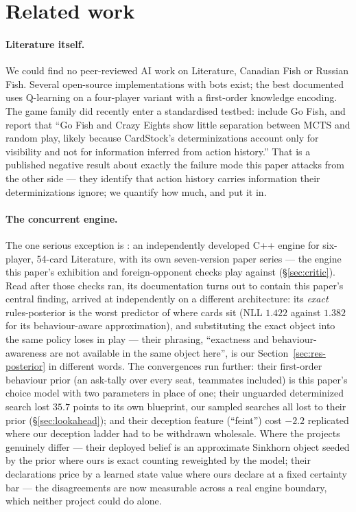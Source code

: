 \documentclass[11pt,a4paper]{article}
\begin{document}
\section{Related work}
\label{sec:related}

\paragraph{Literature itself.} We could find no peer-reviewed AI work on
Literature, Canadian Fish or Russian Fish. Several open-source implementations
with bots exist; the best documented uses Q-learning on a four-player variant
with a first-order knowledge encoding. The game family did recently enter a
standardised testbed: \citet{goadrich2026valet} include Go Fish, and report that
``Go Fish and Crazy Eights show little separation between MCTS and random play,
likely because CardStock's determinizations account only for visibility and not
for information inferred from action history.'' That is a published negative
result about exactly the failure mode this paper attacks from the other side ---
they identify that action history carries information their determinizations
ignore; we quantify how much, and put it in.

\paragraph{The concurrent engine.} The one serious exception is
\citet{dylan2026fishbot}: an independently developed C++ engine for
six-player, 54-card Literature, with its own seven-version paper series ---
the engine this paper's exhibition and foreign-opponent checks play against
(\S\ref{sec:critic}). Read after those checks ran, its documentation turns
out to contain this paper's central finding, arrived at independently on a
different architecture: its \emph{exact} rules-posterior is the worst
predictor of where cards sit (NLL $1.422$ against $1.382$ for its
behaviour-aware approximation), and substituting the exact object into the
same policy loses in play --- their phrasing, ``exactness and
behaviour-awareness are not available in the same object here'', is our
Section~\ref{sec:res-posterior} in different words. The convergences run
further: their first-order behaviour prior (an ask-tally over every seat,
teammates included) is this paper's choice model with two parameters in
place of one; their unguarded determinized search lost $35.7$ points to its
own blueprint, our sampled searches all lost to their prior
(\S\ref{sec:lookahead}); and their deception feature (``feint'') cost
$-2.2$ replicated where our deception ladder had to be withdrawn wholesale.
Where the projects genuinely differ --- their deployed belief is an
approximate Sinkhorn object seeded by the prior where ours is exact
counting reweighted by the model; their declarations price by a learned
state value where ours declare at a fixed certainty bar --- the
disagreements are now measurable across a real engine boundary, which
neither project could do alone.
\end{document}
